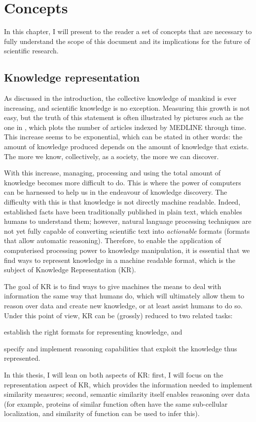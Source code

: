 \chapter{Concepts} \label{chap:concepts}

In this chapter, I will present to the reader a set of concepts that are necessary to fully understand the scope of this document and its implications for the future of scientific research.

\section{Knowledge representation} \label{sec:concepts/knowledge-representation}

As discussed in the introduction, the collective knowledge of mankind is ever increasing, and scientific knowledge is no exception. Measuring this growth is not easy, but the truth of this statement is often illustrated by pictures such as the one in , which plots the number of articles indexed by MEDLINE through time. This increase seems to be exponential, which can be stated in other words: the amount of knowledge produced depends on the amount of knowledge that exists. The more we know, collectively, as a society, the more we can discover.

With this increase, managing, processing and using the total amount of knowledge becomes more difficult to do. This is where the power of computers can be harnessed to help us in the endeavour of knowledge discovery. The difficulty with this is that knowledge is not directly machine readable. Indeed, established facts have been traditionally published in plain text, which enables humans to understand them; however, natural language processing techniques are not yet fully capable of converting scientific text into \emph{actionable} formats (\eg formats that allow automatic reasoning). Therefore, to enable the application of computerised processing power to knowledge manipulation, it is essential that we find ways to represent knowledge in a machine readable format, which is the subject of Knowledge Representation (KR).

The goal of KR is to find ways to give machines the means to deal with information the same way that humans do, which will ultimately allow them to reason over data and create new knowledge, or at least assist humans to do so. Under this point of view, KR can be (grossly) reduced to two related tasks:
\begin{paralist}
    \item establish the right formats for representing knowledge, and
    \item specify and implement reasoning capabilities that exploit the knowledge thus represented.
\end{paralist}
In this thesis, I will lean on both aspects of KR: first, I will focus on the representation aspect of KR, which provides the information needed to implement similarity measures; second, semantic similarity itself enables reasoning over data (for example, proteins of similar function often have the same sub-cellular localization, and similarity of function can be used to infer this).


